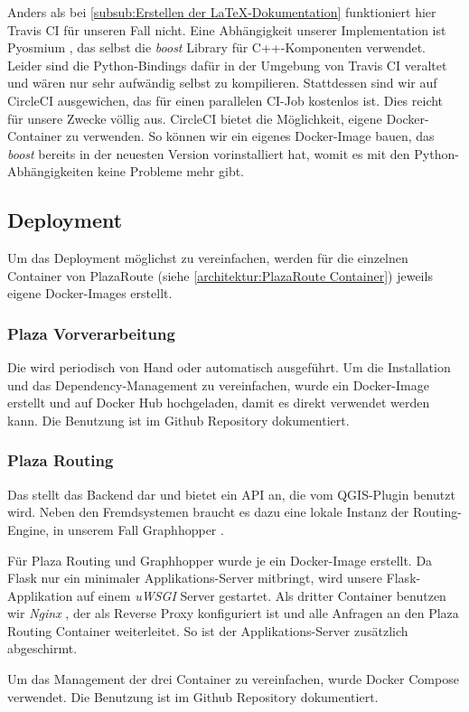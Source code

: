 Anders als bei \ref{subsub:Erstellen der LaTeX-Dokumentation} funktioniert hier Travis CI für unseren Fall nicht. Eine Abhängigkeit unserer Implementation ist Pyosmium \cite{pyosmium}, das selbst die \emph{boost} Library für C++-Komponenten verwendet. Leider sind die Python-Bindings dafür in der Umgebung von Travis CI veraltet und wären nur sehr aufwändig selbst zu kompilieren. Stattdessen sind wir auf CircleCI \cite{circleci} ausgewichen, das für einen parallelen \ac{CI}-Job kostenlos ist. Dies reicht für unsere Zwecke völlig aus. CircleCI bietet die Möglichkeit, eigene Docker-Container zu verwenden. So können wir ein eigenes Docker-Image bauen, das \emph{boost} bereits in der neuesten Version vorinstalliert hat, womit es mit den Python-Abhängigkeiten keine Probleme mehr gibt.

\subsection{Deployment}
\label{sub:Deployment}

Um das Deployment möglichst zu vereinfachen, werden für die einzelnen Container von PlazaRoute (siehe \ref{architektur:PlazaRoute Container}) jeweils eigene Docker-Images erstellt.

\subsubsection{Plaza Vorverarbeitung}
\label{deployment:Plaza Vorverarbeitung}

Die  wird periodisch von Hand oder automatisch ausgeführt. Um die Installation und das Dependency-Management zu vereinfachen, wurde ein Docker-Image erstellt und auf Docker Hub \cite{dockerhub:plazaroute} hochgeladen, damit es direkt verwendet werden kann. Die Benutzung ist im Github Repository \cite{github:PlazaRoute} dokumentiert.

\subsubsection{Plaza Routing}
\label{deployment:Plaza Routing}

Das  stellt das Backend dar und bietet ein API an, die vom QGIS-Plugin benutzt wird. Neben den Fremdsystemen braucht es dazu eine lokale Instanz der Routing-Engine, in unserem Fall Graphhopper \cite{graphhopper}.

Für Plaza Routing und Graphhopper wurde je ein Docker-Image erstellt. Da Flask \cite{flask} nur ein minimaler Applikations-Server mitbringt, wird unsere Flask-Applikation auf einem \emph{uWSGI} \cite{uwsgi} Server gestartet. Als dritter Container benutzen wir \emph{Nginx} \cite{nginx}, der als Reverse Proxy konfiguriert ist und alle Anfragen an den Plaza Routing Container weiterleitet. So ist der Applikations-Server zusätzlich abgeschirmt.

Um das Management der drei Container zu vereinfachen, wurde Docker Compose \cite{docker-compose} verwendet. Die Benutzung ist im Github Repository \cite{github:PlazaRoute} dokumentiert.